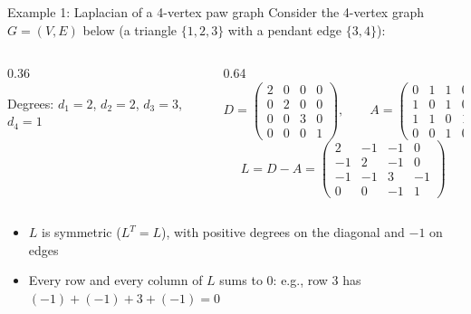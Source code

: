 \documentclass[aspectratio=169]{beamer}\usepackage[]{graphicx}\usepackage[]{xcolor}
\begin{document}
\begin{frame}{Example 1: Laplacian of a 4-vertex paw graph}
Consider the 4-vertex graph $G = (V, E)$ below (a triangle $\{1, 2, 3\}$ with a pendant edge $\{3, 4\}$):
\vfill
\begin{columns}[c]
\begin{column}{0.36\textwidth}
\centering
{}
\vskip0.15cm
\footnotesize
Degrees: $d_1 = 2$, $d_2 = 2$, $d_3 = 3$, $d_4 = 1$
\end{column}
\begin{column}{0.64\textwidth}
\[
D = \begin{pmatrix}
2 & 0 & 0 & 0 \\
0 & 2 & 0 & 0 \\
0 & 0 & 3 & 0 \\
0 & 0 & 0 & 1
\end{pmatrix}, \qquad
A = \begin{pmatrix}
0 & 1 & 1 & 0 \\
1 & 0 & 1 & 0 \\
1 & 1 & 0 & 1 \\
0 & 0 & 1 & 0
\end{pmatrix}
\]
\[
L = D - A = \begin{pmatrix}
2 & -1 & -1 & 0 \\
-1 & 2 & -1 & 0 \\
-1 & -1 & 3 & -1 \\
0 & 0 & -1 & 1
\end{pmatrix}
\]
\end{column}
\end{columns}
\vfill
\begin{itemize}
\item $L$ is symmetric ($L^T = L$), with positive degrees on the diagonal and $-1$ on edges
\item Every row and every column of $L$ sums to $0$: e.g., row 3 has $(-1) + (-1) + 3 + (-1) = 0$
\end{itemize}
\end{frame}
\end{document}
